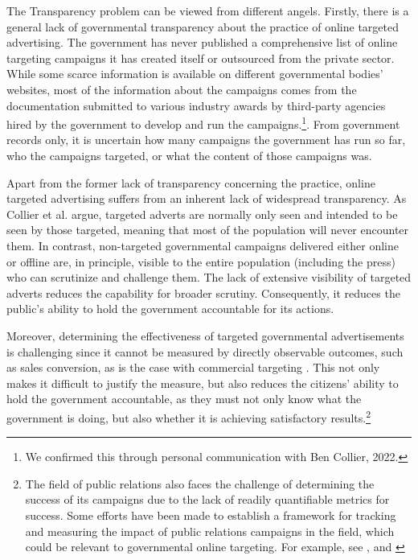 \documentclass[preprint]{acmart}
\begin{document}
The Transparency problem can be viewed from different angels. Firstly, there is a general lack of governmental transparency about the practice of online targeted advertising. The government has never published a comprehensive list of online targeting campaigns it has created itself or outsourced from the private sector. While some scarce information is available on different governmental bodies' websites, most of the information about the campaigns comes from the documentation submitted to various industry awards by third-party agencies hired by the government to develop and run the campaigns.\footnote{We confirmed this through personal communication with Ben Collier, 2022.}. From government records only, it is uncertain how many campaigns the government has run so far, who the campaigns targeted, or what the content of those campaigns was.



Apart from the former lack of transparency concerning the practice, online targeted advertising suffers from an inherent lack of widespread transparency. As Collier et al. \cite{Collier2022} argue, targeted adverts are normally only seen and intended to be seen by those targeted, meaning that most of the population will never encounter them. In contrast, non-targeted governmental campaigns delivered either online or offline are, in principle, visible to the entire population (including the press) who can scrutinize and challenge them. The lack of extensive visibility of targeted adverts reduces the capability for broader scrutiny. Consequently, it reduces the public's ability to hold the government accountable for its actions. 


Moreover, determining the effectiveness of targeted governmental advertisements is challenging since it cannot be measured by directly observable outcomes, such as sales conversion, as is the case with commercial targeting \cite{Collier2022}.  This not only makes it difficult to justify the measure, but also reduces the citizens' ability to hold the government accountable, as they must not only know what the government is doing, but also whether it is achieving satisfactory results.\footnote{The field of public relations also faces the challenge of determining the success of its campaigns due to the lack of readily quantifiable metrics for success. Some efforts have been made to establish a framework for tracking and measuring the impact of public relations campaigns in the field, which could be relevant to governmental online targeting. For example, see \cite{bakir2}, \cite{Michaelson} and \cite{plowman}} 
\end{document}
